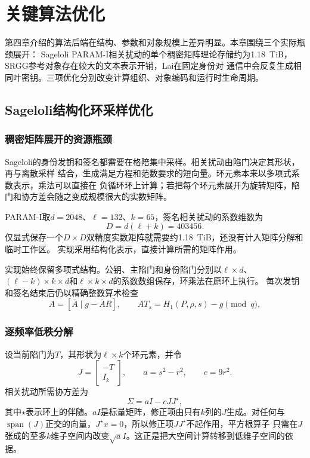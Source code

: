 \chapter{关键算法优化}

第四章介绍的算法后端在结构、参数和对象规模上差异明显。本章围绕三个实际瓶颈展开：
Sageloli PARAM-I相关扰动的单个稠密矩阵理论存储约为1.18~TiB，SRGG参考对象存在较大的文本表示开销，Lai在固定身份对
通信中会反复生成相同叶密钥。三项优化分别改变计算组织、对象编码和运行时生命周期。

\section{Sageloli结构化环采样优化}

\subsection{稠密矩阵展开的资源瓶颈}

Sageloli的身份发钥和签名都需要在格陪集中采样。相关扰动由陷门决定其形状，再与离散采样
结合，生成满足方程和范数要求的短向量。环元素本来以多项式系数表示，乘法可以直接在
负循环环上计算；若把每个环元素展开为旋转矩阵，陷门和协方差会随之变成规模很大的实数矩阵。

PARAM-I取$d=2048$、$\ell=132$、$k=65$，签名相关扰动的系数维数为
\[
 D=d(\ell+k)=403456.
\]
仅显式保存一个$D\times D$双精度实数矩阵就需要约1.18~TiB，还没有计入矩阵分解和临时工作区。
实现采用结构化表示，直接计算所需的矩阵作用。

实现始终保留多项式结构。公钥、主陷门和身份陷门分别以$\ell\times d$、
$(\ell-k)\times k\times d$和$\ell\times k\times d$的系数数组保存，环乘法在原环上执行。
每次发钥和签名结束后仍以精确整数算术检查
\[
 A=[\bar A\mid g-\bar AR],\qquad
 AT_s=H_1(P,\rho,s)-g\pmod q,
\]


\subsection{逐频率低秩分解}

设当前陷门为$T$，其形状为$\ell\times k$个环元素，并令
\[
 J=\begin{bmatrix}-T\\I_k\end{bmatrix},\qquad
 a=s^2-r^2,\qquad c=9r^2.
\]
相关扰动所需协方差为
\[
 \Sigma=aI-cJJ^\star,
\]
其中$\star$表示环上的伴随。$aI$是标量矩阵，修正项由只有$k$列的$J$生成。对任何与
$\operatorname{span}(J)$正交的向量，$J^\star x=0$，所以修正项$JJ^\star$不起作用，平方根算子
只需在$J$张成的至多$k$维子空间内改变$\sqrt a I$。这正是把大空间计算转移到低维子空间的依据。

